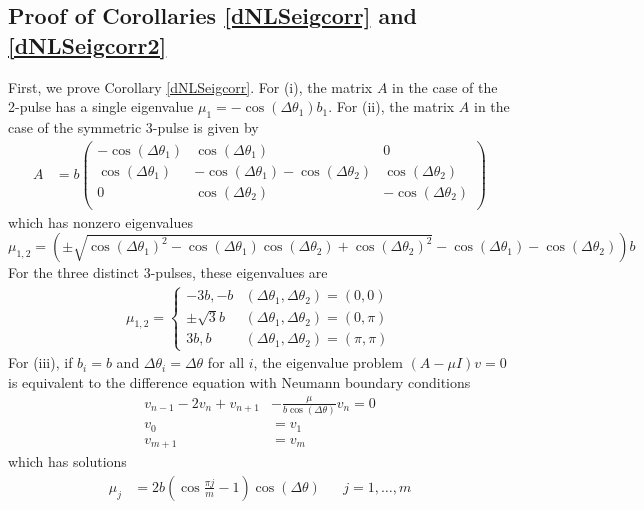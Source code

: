 \documentclass[12pt]{article}
\begin{document}
\subsection{Proof of Corollaries \ref{dNLSeigcorr} and \ref{dNLSeigcorr2}}

First, we prove Corollary \ref{dNLSeigcorr}. For (i), the matrix $A$ in the case of the 2-pulse has a single eigenvalue $\mu_1 = -\cos(\Delta\theta_1) b_1$. For (ii), the matrix $A$ in the case of the symmetric 3-pulse is given by
\begin{align*}
A &= b \begin{pmatrix}
-\cos(\Delta\theta_1) & \cos(\Delta\theta_1) & 0  \\
\cos(\Delta\theta_1) & -\cos(\Delta\theta_1) - \cos(\Delta\theta_2) & \cos(\Delta\theta_2) \\ 
0 & \cos(\Delta\theta_2) & -\cos(\Delta\theta_2) \\
\end{pmatrix}
\end{align*}
which has nonzero eigenvalues
\[
\mu_{1, 2} = \left( \pm\sqrt{\cos(\Delta\theta_1)^2 - \cos(\Delta\theta_1) \cos(\Delta\theta_2) + \cos(\Delta\theta_2)^2} - \cos(\Delta\theta_1) - \cos(\Delta\theta_2) \right)b
\]
For the three distinct 3-pulses, these eigenvalues are
\begin{align*}
\mu_{1, 2} = \begin{cases}
-3b, -b & (\Delta\theta_1, \Delta\theta_2) = (0, 0) \\
\pm \sqrt{3}b & (\Delta\theta_1, \Delta\theta_2) = (0, \pi) \\
3b, b & (\Delta\theta_1, \Delta\theta_2) = (\pi, \pi)
\end{cases}
\end{align*}
For (iii), if $b_i = b$ and $\Delta\theta_i = \Delta\theta$ for all $i$, the eigenvalue problem $(A - \mu I)v = 0$ is equivalent to the difference equation with Neumann boundary conditions
\begin{equation*}
\begin{aligned}
v_{n-1} - 2 v_n + v_{n+1} &- \frac{\mu}{b \cos(\Delta\theta)} v_n = 0 \\
v_0 &= v_1 \\
v_{m+1} &= v_m
\end{aligned}
\end{equation*}
which has solutions
\begin{align*}
\mu_j &= 2 b \left( \cos\frac{\pi j}{m} - 1 \right) \cos (\Delta\theta) && j = 1, \dots, m
\end{align*}
\end{document}
